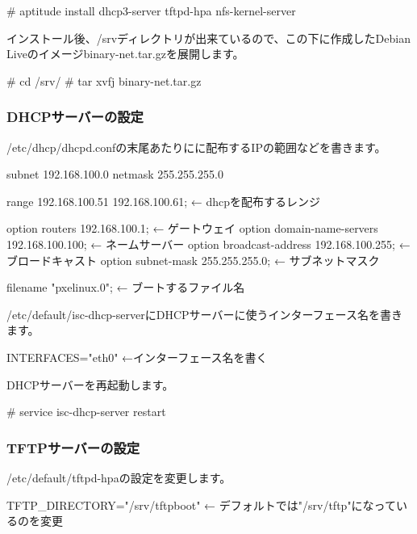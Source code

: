 \documentclass[mingoth,a4paper]{jsarticle}
\begin{document}
\begin{commandline}
 # aptitude install dhcp3-server tftpd-hpa nfs-kernel-server
\end{commandline}

インストール後、/srvディレクトリが出来ているので、この下に作成したDebian
Liveのイメージbinary-net.tar.gzを展開します。

\begin{commandline}
 # cd /srv/
 # tar xvfj binary-net.tar.gz
\end{commandline}

\subsubsection{DHCPサーバーの設定}

/etc/dhcp/dhcpd.confの末尾あたりにに配布するIPの範囲などを書きます。

\begin{commandline}
subnet 192.168.100.0 netmask 255.255.255.0 {
  range 192.168.100.51 192.168.100.61; ← dhcpを配布するレンジ

  option routers 192.168.100.1; ← ゲートウェイ
  option domain-name-servers 192.168.100.100; ← ネームサーバー
  option broadcast-address 192.168.100.255; ← ブロードキャスト
  option subnet-mask 255.255.255.0; ← サブネットマスク

  filename "pxelinux.0"; ← ブートするファイル名
}
\end{commandline}

/etc/default/isc-dhcp-serverにDHCPサーバーに使うインターフェース名を書き
ます。

\begin{commandline}
 INTERFACES="eth0" ←インターフェース名を書く
\end{commandline}

DHCPサーバーを再起動します。

\begin{commandline}
 # service isc-dhcp-server restart
\end{commandline}

\subsubsection{TFTPサーバーの設定}

/etc/default/tftpd-hpaの設定を変更します。

\begin{commandline}
 TFTP_DIRECTORY="/srv/tftpboot" ← デフォルトでは"/srv/tftp"になっているのを変更
\end{commandline}
\end{document}
